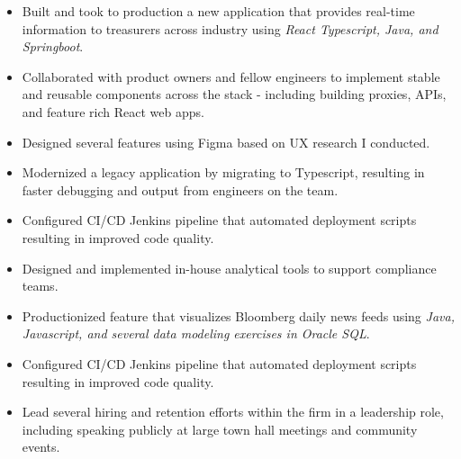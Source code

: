 \documentclass[10pt,a4paper]{altacv}
\begin{document}
\begin{itemize}
\item Built and took to production a new application that provides real-time information to treasurers across industry using
 \textit{React Typescript, Java, and Springboot}. 
\item Collaborated with product owners and fellow engineers to implement stable and reusable components across the stack - including building proxies, APIs, and feature rich React web apps.
\item Designed several features using Figma based on UX research I conducted.
\item Modernized a legacy application by migrating to Typescript, resulting in faster debugging and output from engineers on the team.
\item Configured CI/CD Jenkins pipeline that automated deployment scripts resulting in improved code quality.
\end{itemize}
\vspace{5pt}
\begin{itemize}
\item  Designed and implemented in-house analytical tools to support compliance teams.
\item Productionized feature that visualizes Bloomberg daily news feeds using \textit{Java, Javascript, and several data modeling exercises in Oracle SQL}.
\item Configured CI/CD Jenkins pipeline that automated deployment scripts resulting in improved code quality. 
\end{itemize}
\vspace{5pt}
\begin{itemize}
\item Lead several hiring and retention efforts within the firm in a leadership role, including speaking publicly at large town hall meetings and community events.
\end{itemize}
\end{document}
